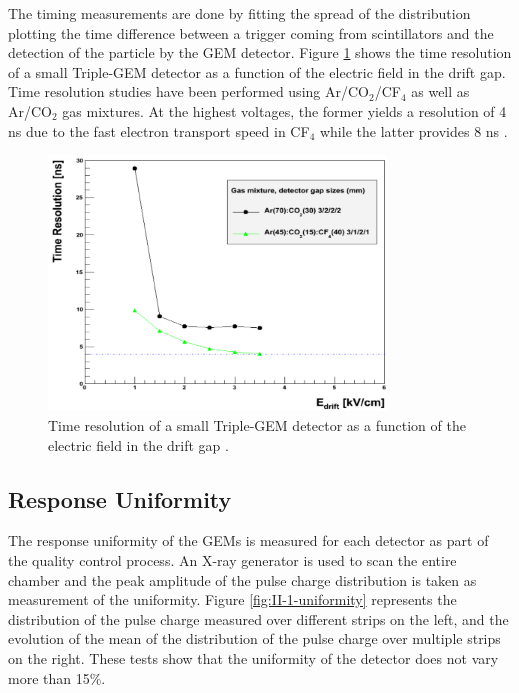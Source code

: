       The timing measurements are done by fitting the spread of the distribution plotting the time difference between a trigger coming from scintillators and the detection of the particle by the GEM detector. Figure \ref{fig:II-1-time-res} shows the time resolution of a small Triple-GEM detector as a function of the electric field in the drift gap. Time resolution studies have been performed using Ar/CO$_2$/CF$_4$ as well as Ar/CO$_2$ gas mixtures. At the highest voltages, the former yields a resolution of 4 ns due to the fast electron transport speed in CF$_4$ while the latter provides 8 ns \cite{Thierry:2065693}. \\

      \begin{figure}[t!]
        \centering
        \includegraphics[width=0.8\textwidth]{img/II-1-gem/time-resolution.png}
        \caption{Time resolution of a small Triple-GEM detector as a function of the electric field in the drift gap \cite{Thierry:2065693}.}
        \label{fig:II-1-time-res}
      \end{figure}

    \subsection{Response Uniformity}

      The response uniformity of the GEMs is measured for each detector as part of the quality control process. An X-ray generator is used to scan the entire chamber and the peak amplitude of the pulse charge distribution is taken as measurement of the uniformity. Figure \ref{fig:II-1-uniformity} represents the distribution of the pulse charge measured over different strips on the left, and the evolution of the mean of the distribution of the pulse charge over multiple strips on the right. These tests show that the uniformity of the detector does not vary more than 15\%.

